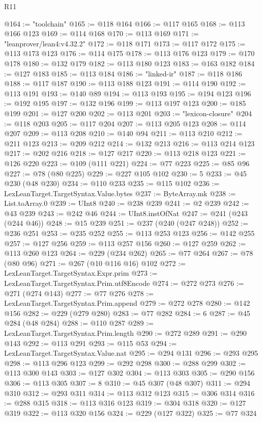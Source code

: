 \begin{lexlean}{R11}
\begin{coremodule}
@164 := "toolchain"
@165 := @118 @164
@166 := @117 @165
@168 := @113 @166 @123
@169 := @114 @168
@170 := @113 @169
@171 := "leanprover/lean4:v4.32.2"
@172 := @118 @171
@173 := @117 @172
@175 := @113 @173 @123
@176 := @114 @175
@178 := @113 @176 @123
@179 := @170 @178
@180 := @132 @179
@182 := @113 @180 @123
@183 := @163 @182
@184 := @127 @183
@185 := @113 @184
@186 := "linked-ir"
@187 := @118 @186
@188 := @117 @187
@190 := @113 @188 @123
@191 := @114 @190
@192 := @113 @191
@193 := @140 @89
@194 := @113 @193
@195 := @194 @123
@196 := @192 @195
@197 := @132 @196
@199 := @113 @197 @123
@200 := @185 @199
@201 := @127 @200
@202 := @113 @201
@203 := "lexicon-closure"
@204 := @118 @203
@205 := @117 @204
@207 := @113 @205 @123
@208 := @114 @207
@209 := @113 @208
@210 := @140 @94
@211 := @113 @210
@212 := @211 @123
@213 := @209 @212
@214 := @132 @213
@216 := @113 @214 @123
@217 := @202 @216
@218 := @127 @217
@220 := @113 @218 @123
@221 := @126 @220
@223 := @109 (@111 @221)
@224 := @77 @223
@225 := @85 @96
@227 := @78 (@80 @225)
@229 := @227 @105 @102
@230 := 5
@233 := @45 @230 (@48 @230)
@234 := @110 @233
@235 := @115 @102
@236 := LexLeanTarget.TargetSyntax.Value.bytes
@237 := ByteArray.mk
@238 := List.toArray.{0}
@239 := UInt8
@240 := @238 @239
@241 := @2 @239
@242 := @43 @239
@243 := @242 @46
@244 := UInt8.instOfNat
@247 := @241 (@243 (@244 @46))
@248 := @15 @239
@251 := @237 (@240 (@247 @248))
@252 := @236 @251
@253 := @235 @252
@255 := @113 @253 @123
@256 := @142 @255
@257 := @127 @256
@259 := @113 @257 @156
@260 := @127 @259
@262 := @113 @260 @123
@264 := @229 (@234 @262)
@265 := @77 @264
@267 := @78 (@80 @96)
@271 := @267 (@10 @116 @16) @102
@272 := LexLeanTarget.TargetSyntax.Expr.prim
@273 := LexLeanTarget.TargetSyntax.Prim.utf8Encode
@274 := @272 @273
@276 := @271 (@274 @143)
@277 := @77 @276
@278 := LexLeanTarget.TargetSyntax.Prim.append
@279 := @272 @278
@280 := @142 @156
@282 := @229 (@279 @280)
@283 := @77 @282
@284 := 6
@287 := @45 @284 (@48 @284)
@288 := @110 @287
@289 := LexLeanTarget.TargetSyntax.Prim.length
@290 := @272 @289
@291 := @290 @143
@292 := @113 @291
@293 := @115 @53
@294 := LexLeanTarget.TargetSyntax.Value.nat
@295 := @294 @131
@296 := @293 @295
@298 := @113 @296 @123
@299 := @292 @298
@300 := @288 @299
@302 := @113 @300 @143
@303 := @127 @302
@304 := @113 @303
@305 := @290 @156
@306 := @113 @305
@307 := 8
@310 := @45 @307 (@48 @307)
@311 := @294 @310
@312 := @293 @311
@314 := @113 @312 @123
@315 := @306 @314
@316 := @288 @315
@318 := @113 @316 @123
@319 := @304 @318
@320 := @127 @319
@322 := @113 @320 @156
@324 := @229 (@127 @322)
@325 := @77 @324

\end{coremodule}
\end{lexlean}
